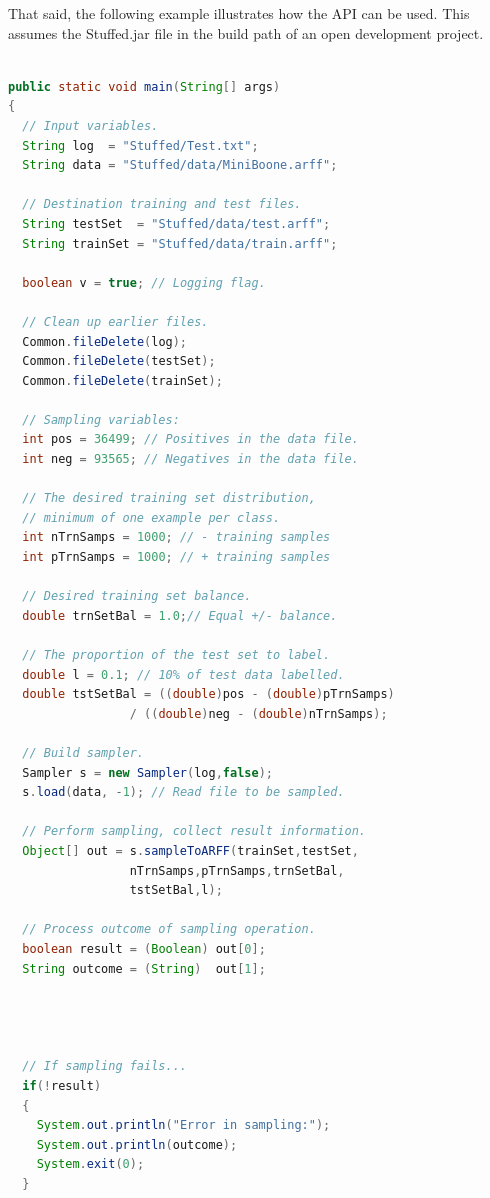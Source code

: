\documentclass[twoside,a4paper]{refart}
\begin{document}
That said, the following example illustrates how the API can be used. This assumes the Stuffed.jar file in the build path of an open development project. 

\begin{lstlisting}[caption={Code which uses our sampling procedure to create a test stream for classification. A Hoeffding tree classifier is then used to classify it.},language=Java,showstringspaces=false,basicstyle=\footnotesize]

public static void main(String[] args) 
{
  // Input variables.
  String log  = "Stuffed/Test.txt";
  String data = "Stuffed/data/MiniBoone.arff";
	
  // Destination training and test files.
  String testSet  = "Stuffed/data/test.arff";
  String trainSet = "Stuffed/data/train.arff";
		
  boolean v = true; // Logging flag.
		
  // Clean up earlier files.
  Common.fileDelete(log);
  Common.fileDelete(testSet);
  Common.fileDelete(trainSet);
			
  // Sampling variables:
  int pos = 36499; // Positives in the data file.
  int neg = 93565; // Negatives in the data file.
        
  // The desired training set distribution,
  // minimum of one example per class.
  int nTrnSamps = 1000; // - training samples
  int pTrnSamps = 1000; // + training samples
        
  // Desired training set balance.
  double trnSetBal = 1.0;// Equal +/- balance.
        
  // The proportion of the test set to label.
  double l = 0.1; // 10% of test data labelled.
  double tstSetBal = ((double)pos - (double)pTrnSamps) 
                 / ((double)neg - (double)nTrnSamps);
        
  // Build sampler.
  Sampler s = new Sampler(log,false);
  s.load(data, -1); // Read file to be sampled.
        
  // Perform sampling, collect result information.
  Object[] out = s.sampleToARFF(trainSet,testSet,
                 nTrnSamps,pTrnSamps,trnSetBal,
                 tstSetBal,l);
        
  // Process outcome of sampling operation.
  boolean result = (Boolean) out[0];
  String outcome = (String)  out[1];
  
  
  
        
  // If sampling fails...
  if(!result)
  {
	System.out.println("Error in sampling:");
	System.out.println(outcome);
	System.exit(0);
  }
        

\end{lstlisting}
\end{document}
